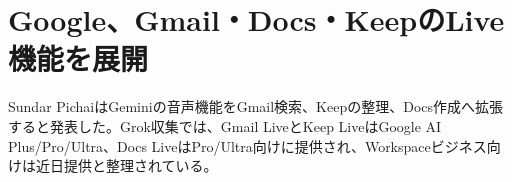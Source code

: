 \section{Google、Gmail・Docs・KeepのLive機能を展開}

Sundar PichaiはGeminiの音声機能をGmail検索、Keepの整理、Docs作成へ拡張すると発表した。Grok収集では、Gmail LiveとKeep LiveはGoogle AI Plus/Pro/Ultra、Docs LiveはPro/Ultra向けに提供され、Workspaceビジネス向けは近日提供と整理されている。


